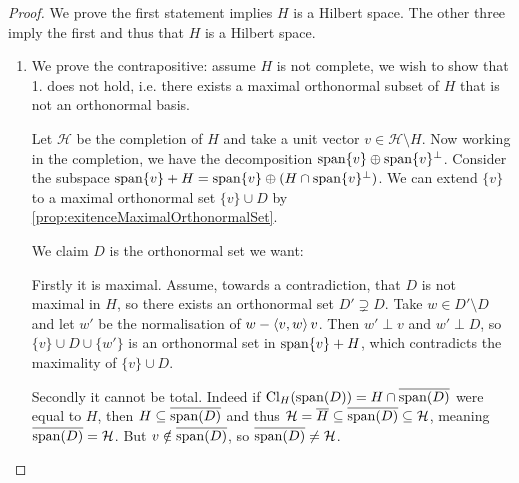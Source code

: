 \begin{proof}
We prove the first statement implies $H$ is a Hilbert space. The other three imply the first and thus that $H$ is a Hilbert space.
\begin{enumerate}
\item We prove the contrapositive: assume $H$ is not complete, we wish to show that 1. does not hold, i.e. there exists a maximal orthonormal subset of $H$ that is not an orthonormal basis.

Let $\mathcal{H}$ be the completion of $H$ and take a unit vector $v\in \mathcal{H}\setminus H$. Now working in the completion, we have the decomposition $\operatorname{span}\{v\}\oplus \operatorname{span}\{v\}^\perp$. Consider the subspace $\operatorname{span}\{v\} + H = \operatorname{span}\{v\}\oplus(H\cap \operatorname{span}\{v\}^\perp)$. We can extend $\{v\}$ to a maximal orthonormal set $\{v\}\cup D$ by \ref{prop:exitenceMaximalOrthonormalSet}.

We claim $D$ is the orthonormal set we want:

Firstly it is maximal.
Assume, towards a contradiction, that $D$ is not maximal in $H$, so there exists an orthonormal set $D'\supsetneq D$. Take $w\in D'\setminus D$ and let $w'$ be the normalisation of $w - \left\langle v,w \right\rangle v$. Then $w' \perp v$ and $w' \perp D$, so $\{v\}\cup D\cup\{w'\}$ is an orthonormal set in $\operatorname{span}\{v\} + H$, which contradicts the maximality of $\{v\}\cup D$.

Secondly it cannot be total. Indeed if $\operatorname{Cl}_H(\operatorname{span}(D)) = H\cap\overline{\operatorname{span}(D)}$ were equal to $H$, then $H \subseteq \overline{\operatorname{span}(D)}$ and thus $\mathcal{H} = \overline{H} \subseteq \overline{\operatorname{span}(D)} \subseteq \mathcal{H}$, meaning $\overline{\operatorname{span}(D)} = \mathcal{H}$. But $v\notin \overline{\operatorname{span}(D)}$, so $\overline{\operatorname{span}(D)} \neq \mathcal{H}$.


\end{enumerate}
\end{proof}
